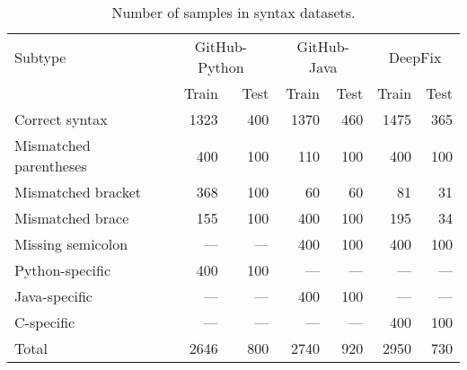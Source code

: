 \begin{table}[h]
    \centering
    \caption{Number of samples in syntax datasets.}
    \label{tab:syntax-datasets}
    \begin{tabular}{lrrrrrr}
    \toprule
         Subtype & \multicolumn{2}{c}{GitHub-Python} & \multicolumn{2}{c}{GitHub-Java} & \multicolumn{2}{c}{DeepFix}\\
         \cmidrule(lr){2-3}\cmidrule(lr){4-5}\cmidrule(lr){6-7}
         & Train & Test & Train & Test & Train & Test\\
         \midrule
         Correct syntax & 1323 & 400 & 1370 & 460 & 1475 & 365\\
         Mismatched parentheses & 400 & 100 & 110 & 100 & 400 & 100\\
         Mismatched bracket & 368 & 100 & 60 & 60 & 81 & 31\\
         Mismatched brace & 155 & 100 & 400 & 100 & 195 & 34 \\
         Missing semicolon & --- & --- & 400 & 100 & 400 & 100 \\
         Python-specific & 400 & 100 & --- & --- & --- & ---\\
         Java-specific & --- & --- & 400 & 100 & --- & --- \\
         C-specific & --- & --- & --- & --- & 400 & 100 \\
         \midrule
         Total & 2646 & 800 & 2740 & 920 & 2950 & 730\\
    \bottomrule
    \end{tabular}
\end{table}

